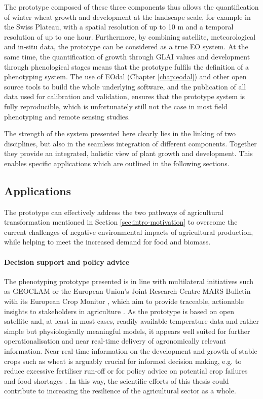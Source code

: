 The prototype composed of these three components thus allows the quantification of winter wheat growth and development at the landscape scale, for example in the Swiss Plateau, with a spatial resolution of up to 10 m and a temporal resolution of up to one hour. Furthermore, by combining satellite, meteorological and in-situ data, the prototype can be considered as a true \gls{EO} system. At the same time, the quantification of growth through \gls{GLAI} values and development through phenological stages means that the prototype fulfils the definition of a phenotyping system. The use of \gls{EOdal} (Chapter \ref{chap:eodal}) and other open source tools to build the whole underlying software, and the publication of all data used for calibration and validation, ensures that the prototype system is fully reproducible, which is unfortunately still not the case in most field phenotyping and remote sensing studies.

The strength of the system presented here clearly lies in the linking of two disciplines, but also in the seamless integration of different components. Together they provide an integrated, holistic view of plant growth and development. This enables specific applications which are outlined in the following sections.

\subsection{Applications}
The prototype can effectively address the two pathways of agricultural transformation mentioned in Section \ref{sec:intro-motivation} to overcome the current challenges of negative environmental impacts of agricultural production, while helping to meet the increased demand for food and biomass.

\paragraph{Decision support and policy advice}
The phenotyping prototype presented is in line with multilateral initiatives such as \gls{GEOCLAM} or the European Union's Joint Research Centre MARS Bulletin with its European Crop Monitor \citep{van_der_velde_use_2019}, which aim to provide traceable, actionable insights to stakeholders in agriculture \citep{whitcraft_no_2019}. As the prototype is based on open satellite and, at least in most cases, readily available temperature data and rather simple but physiologically meaningful models, it appears well suited for further operationalisation and near real-time delivery of agronomically relevant information. Near-real-time information on the development and growth of stable crops such as wheat is arguably crucial for informed decision making, e.g. to reduce excessive fertiliser run-off \citep{argento_linking_2022} or for policy advice on potential crop failures and food shortages \citep{becker-reshef_strengthening_2020}. In this way, the scientific efforts of this thesis could contribute to increasing the resilience of the agricultural sector as a whole.

